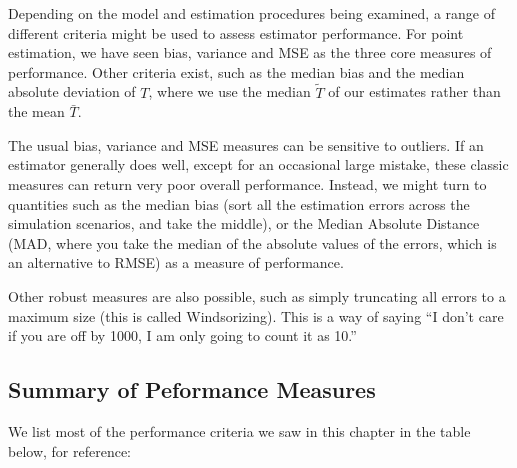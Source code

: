 \documentclass[
]{book}
\begin{document}
Depending on the model and estimation procedures being examined, a range of different criteria might be used to assess estimator performance.
For point estimation, we have seen bias, variance and MSE as the three core measures of performance.
Other criteria exist, such as the median bias and the median absolute deviation of \(T\), where we use the median \(\tilde{T}\) of our estimates rather than the mean \(\bar{T}\).

The usual bias, variance and MSE measures can be sensitive to outliers.
If an estimator generally does well, except for an occasional large mistake, these classic measures can return very poor overall performance.
Instead, we might turn to quantities such as the median bias (sort all the estimation errors across the simulation scenarios, and take the middle), or the Median Absolute Distance (MAD, where you take the median of the absolute values of the errors, which is an alternative to RMSE) as a measure of performance.

Other robust measures are also possible, such as simply truncating all errors to a maximum size (this is called Windsorizing).
This is a way of saying ``I don't care if you are off by 1000, I am only going to count it as 10.''

\subsection{Summary of Peformance Measures}\label{summary-of-peformance-measures}

We list most of the performance criteria we saw in this chapter in the table below, for reference:
\end{document}
